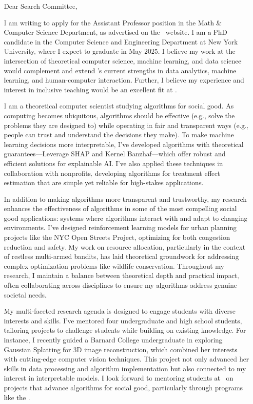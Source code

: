 \documentclass[11pt]{article}
\begin{document}
{\setlength{\parindent}{0cm}

Dear Search Committee,

I am writing to apply for the Assistant Professor position in the Math \& Computer Science Department, as advertised on the \school~website. I am a PhD candidate in the Computer Science and Engineering Department at New York University, where I expect to graduate in May 2025. I believe my work at the intersection of theoretical computer science, machine learning, and data science would complement and extend \school’s current strengths in data analytics, machine learning, and human-computer interaction. Further, I believe my experience and interest in inclusive teaching would be an excellent fit at \school.

I am a theoretical computer scientist studying algorithms for social good. As computing becomes ubiquitous, algorithms should be effective (e.g., solve the problems they are designed to) while operating in fair and transparent ways (e.g., people can trust and understand the decisions they make). To make machine learning decisions more interpretable, I’ve developed algorithms with theoretical guarantees—Leverage SHAP and Kernel Banzhaf—which offer robust and efficient solutions for explainable AI. I’ve also applied these techniques in collaboration with nonprofits, developing algorithms for treatment effect estimation that are simple yet reliable for high-stakes applications.

In addition to making algorithms more transparent and trustworthy, my research enhances the effectiveness of algorithms in some of the most compelling social good applications: systems where algorithms interact with and adapt to changing environments. I’ve designed reinforcement learning models for urban planning projects like the NYC Open Streets Project, optimizing for both congestion reduction and safety. My work on resource allocation, particularly in the context of restless multi-armed bandits, has laid theoretical groundwork for addressing complex optimization problems like wildlife conservation. Throughout my research, I maintain a balance between theoretical depth and practical impact, often collaborating across disciplines to ensure my algorithms address genuine societal needs.

My multi-faceted research agenda is designed to engage students with diverse interests and skills. I've mentored four undergraduate and high school students, tailoring projects to challenge students while building on existing knowledge. For instance, I recently guided a Barnard College undergraduate in exploring Gaussian Splatting for 3D image reconstruction, which combined her interests with cutting-edge computer vision techniques. This project not only advanced her skills in data processing and algorithm implementation but also connected to my interest in interpretable models. I look forward to mentoring students at \school~on projects that advance algorithms for social good, particularly through programs like the \program.

}
\end{document}

